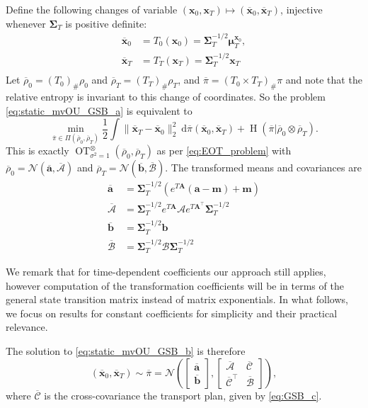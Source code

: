 \documentclass{article}
\newcommand{\Ent}{\operatorname{H}}
\newcommand{\diff}{\mathrm{d}}
\newcommand{\Nc}{\mathcal{N}}
\newcommand{\Ac}{\mathcal{A}}
\newcommand{\Bc}{\mathcal{B}}
\newcommand{\Cc}{\mathcal{C}}
\theoremstyle{newstyle}
\begin{document}
Define the following changes of variable $(\bm{x}_0, \bm{x}_T) \mapsto (\overline{\bm{x}}_0, \overline{\bm{x}}_T)$, injective whenever $\bm{\Sigma}_T$ is positive definite: 
\begin{align*}
  \bm{\overline{x}}_0 &= T_0(\bm{x}_0) = \bm{\Sigma}_T^{-1/2} \bm{\mu}_T^{\bm{x}_0},  \\ 
  \bm{\overline{x}}_T &= T_T(\bm{x}_T) = \bm{\Sigma}_T^{-1/2} \bm{x}_T \\
\end{align*}
Let $\overline{\rho}_0 = (T_0)_\# \rho_0$ and $\overline{\rho}_T = (T_T)_\# \rho_T$, and $\overline{\pi} = (T_0 \times T_T)_\# \pi$ and note that the relative entropy is invariant to this change of coordinates. So the problem \eqref{eq:static_mvOU_GSB_a} is equivalent to 
\begin{equation}
  \min_{\overline{\pi} \in \Pi(\overline{\rho}_0, \overline{\rho}_T)} \frac{1}{2} \int \| \bm{\overline{x}}_T - \bm{\overline{x}}_0 \|_2^2 \: \diff \overline{\pi}(\bm{\overline{x}}_0, \bm{\overline{x}}_T) + \Ent(\overline{\pi} | \overline{\rho}_0 \otimes \overline{\rho}_T). \label{eq:static_mvOU_GSB_b}
\end{equation}
This is exactly $\operatorname{OT}_{\sigma^2 = 1}^{\otimes}(\overline{\rho}_0, \overline{\rho}_T)$ as per \eqref{eq:EOT_problem}
with $\overline{\rho}_0 = \Nc(\overline{\bm{a}}, \overline{\bm{\Ac}})$ and $\overline{\rho}_T = \Nc(\overline{\bm{b}}, \overline{\bm{\Bc}})$. The transformed means and covariances are 
\begin{align*}
  \overline{\bm{a}} &= \bm{\Sigma}_T^{-1/2} (e^{T\bm{A}}(\bm{a} - \bm{m}) + \bm{m}) \\
  \overline{\bm{\Ac}} &= \bm{\Sigma}_T^{-1/2} e^{T\bm{A}} \bm{\Ac} e^{T\bm{A}^\top} \bm{\Sigma}_T^{-1/2} \\
  \overline{\bm{b}} &= \bm{\Sigma}_T^{-1/2} \bm{b} \\
  \overline{\bm{\Bc}} &= \bm{\Sigma}_T^{-1/2} \bm{\Bc} \bm{\Sigma}_T^{-1/2}
\end{align*}

We remark that for time-dependent coefficients our approach still applies, however computation of the transformation coefficients will be in terms of the general state transition matrix instead of matrix exponentials. In what follows, we focus on results for constant coefficients for simplicity and their practical relevance.

The solution to \eqref{eq:static_mvOU_GSB_b} is therefore 
\[
   (\overline{\bm{x}}_0, \overline{\bm{x}}_T) \sim \overline{\pi} = \Nc\left(\begin{bmatrix} \bm{\overline{a}} \\ \bm{\overline{b}} \end{bmatrix}, \begin{bmatrix} \bm{\overline{\Ac}} & \bm{\overline{\Cc}} \\ \bm{\overline{\Cc}}^\top & \bm{\overline{\Bc}} \end{bmatrix} \right),
\]
where $\bm{\overline{\Cc}}$ is the cross-covariance the transport plan, given by \eqref{eq:GSB_c}.
\end{document}
